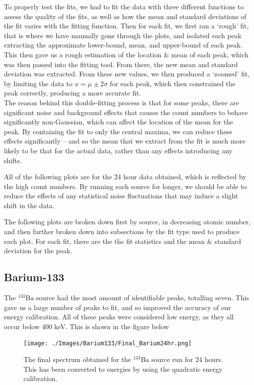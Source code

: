 \documentclass[11pt,a4paper]{article}
\newcommand{\element}[2]{$^{#2}\textrm{#1}$}
\begin{document}
To properly test the fits, we had to fit the data with three different functions to assess the quality of the fits, as well as how the mean and standard deviations of the fit varies with the fitting function. Then for each fit, we first ran a `rough' fit, that is where we have manually gone through the plots, and isolated each peak extracting the approximate lower-bound, mean, and upper-bound of each peak. This then gave us a rough estimation of the location \& mean of each peak, which was then passed into the fitting tool. From there, the new mean and standard deviation was extracted. From these new values, we then produced a `zoomed' fit, by limiting the data to $x = \mu \pm 2 \sigma$ for each peak, which then constrained the peak correctly, producing a more accurate fit.\\
The reason behind this double-fitting process is that for some peaks, there are significant noise and background effects that causes the count numbers to behave significantly non-Gaussian, which can affect the location of the mean for the peak. By containing the fit to only the central maxima, we can reduce these effects significantly -- and so the mean that we extract from the fit is much more likely to be that for the actual data, rather than any effects introducing any shifts. 

All of the following plots are for the 24 hour data obtained, which is reflected by the  high count numbers. By running each source for longer, we should be able to reduce the effects of any statistical noise fluctuations that may induce a slight shift in the data.

The following plots are broken down first by source, in decreasing atomic number, and then further broken down into subsections by the fit type used to produce each plot. For each fit, there are the the fit statistics and the mean \& standard deviation for the peak.

\subsection{Barium-133}
The \element{Ba}{133} source had the most amount of identifiable peaks, totalling seven. This gave us a large number of peaks to fit, and so improved the accuracy of our energy calibration. All of these peaks were considered low energy, as they all occur below 400 keV. This is shown in the figure below
\begin{figure}[H]
  \centering
  \texttt{[image: ./Images/Barium133/Final\_Barium24hr.png]}
  \caption{The final spectrum obtained for the \element{Ba}{133} source run for 24 hours. This has been converted to energies by using the quadratic energy calibration.}
\end{figure}
\end{document}
